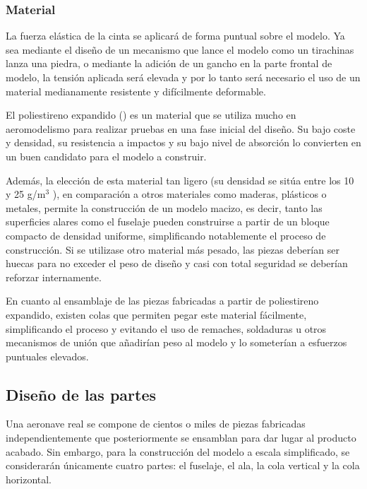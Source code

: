 \subsubsection{Material}
\label{sec:building:conception:material}

La fuerza elástica de la cinta se aplicará de forma puntual sobre el modelo. Ya sea mediante el diseño de un mecanismo que lance el modelo como un tirachinas lanza una piedra, o mediante la adición de un gancho en la parte frontal de modelo, la tensión aplicada será elevada y por lo tanto será necesario el uso de un material medianamente resistente y difícilmente deformable.

El poliestireno expandido () es un material que se utiliza mucho en aeromodelismo para realizar pruebas en una fase inicial del diseño. Su bajo coste y densidad, su resistencia a impactos y su bajo nivel de absorción lo convierten en un buen candidato para el modelo a construir.

Además, la elección de esta material tan ligero (su densidad se sitúa entre los 10 y 25 g/m$^3$ \cite{ref:poliestirenoexpandido}), en comparación a otros materiales como maderas, plásticos o metales, permite la construcción de un modelo macizo, es decir, tanto las superficies alares como el fuselaje pueden construirse a partir de un bloque compacto de densidad uniforme, simplificando notablemente el proceso de construcción. Si se utilizase otro material más pesado, las piezas deberían ser huecas para no exceder el peso de diseño y casi con total seguridad se deberían reforzar internamente.

En cuanto al ensamblaje de las piezas fabricadas a partir de poliestireno expandido, existen colas que permiten pegar este material fácilmente, simplificando el proceso y evitando el uso de remaches, soldaduras u otros mecanismos de unión que añadirían peso al modelo y lo someterían a esfuerzos puntuales elevados.


\subsection{Diseño de las partes}
\label{sec:building:parts}

Una aeronave real se compone de cientos o miles de piezas fabricadas independientemente que posteriormente se ensamblan para dar lugar al producto acabado. Sin embargo, para la construcción del modelo a escala simplificado, se considerarán únicamente cuatro partes: el fuselaje, el ala, la cola vertical y la cola horizontal.

